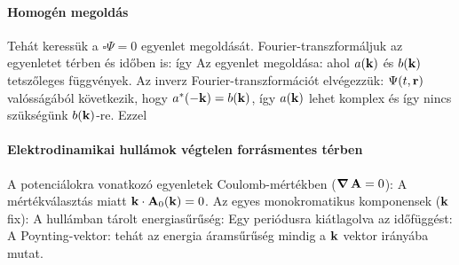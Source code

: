    \paragraph{Homogén megoldás}
    
    Tehát keressük a $\square\Psi=0$ egyenlet megoldását. Fourier-transzformáljuk az egyenletet térben és időben is:
    így 
    Az egyenlet megoldása:
    ahol $a(\mathbf{k})$ és $b(\mathbf{k})$ tetszőleges függvények. Az inverz Fourier-transzformációt elvégezzük:
    $\Psi(t,\mathbf{r})$ valósságából következik, hogy $a^*(-\mathbf{k})=b(\mathbf{k})$, így $a(\mathbf{k})$ lehet komplex és így nincs szükségünk $b(\mathbf{k})$-re. Ezzel
   \paragraph{Elektrodinamikai hullámok végtelen forrásmentes térben}
    
    A potenciálokra vonatkozó egyenletek Coulomb-mértékben ($\mathop{\boldsymbol{\nabla}}\nolimits{\mathbf{A}}=0$):
    A mértékválasztás miatt $\mathbf{k}\cdot\mathbf{A}_0(\mathbf{k})=0$. Az egyes monokromatikus komponensek ($\mathbf{k}$ fix):
    A hullámban tárolt energiasűrűség:
    Egy periódusra kiátlagolva az időfüggést:
    A Poynting-vektor:
    tehát az energia áramsűrűség mindig a $\mathbf{k}$ vektor irányába mutat. 
    
